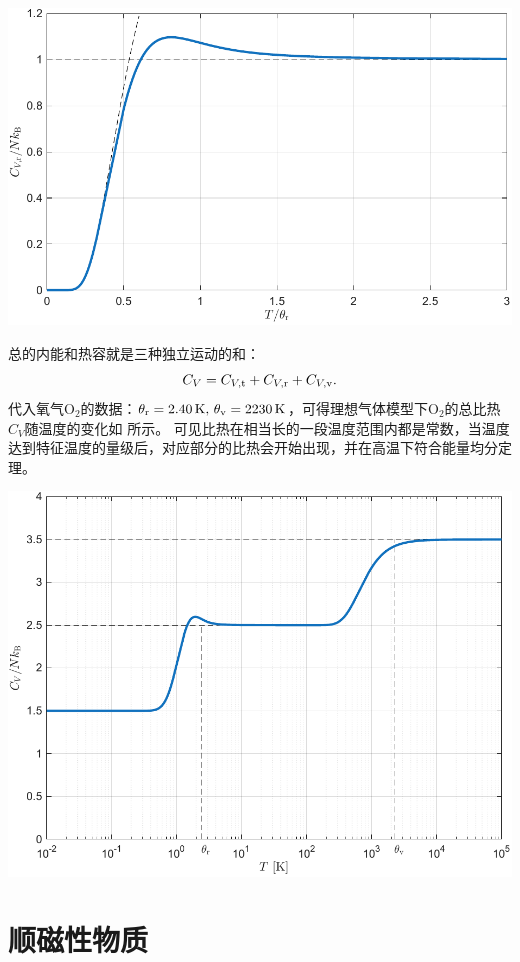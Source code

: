 \begin{center}
	\includegraphics[width=0.8\linewidth]{figures/C_Vrot.pdf}
	\label{fig:C_Vrot - T}
\end{center}

总的内能和热容就是三种独立运动的和：
\[
	C_V=C_{V,\mathrm t}+C_{V,\mathrm r}+C_{V,\mathrm v}.
\]
代入氧气$\mathrm{O_2}$的数据：$\theta_\mathrm r=\SI{2.40}{K},\,\theta_\mathrm v=\SI{2230}{K}$，可得理想气体模型下$\mathrm{O_2}$的总比热$C_V$随温度的变化如 所示。
可见比热在相当长的一段温度范围内都是常数，当温度达到特征温度的量级后，对应部分的比热会开始出现，并在高温下符合能量均分定理。

\begin{center}
	\includegraphics[width=0.8\linewidth]{figures/C_Vtot.pdf}
	\label{fig:C_V - T}
\end{center}

\section{顺磁性物质}

